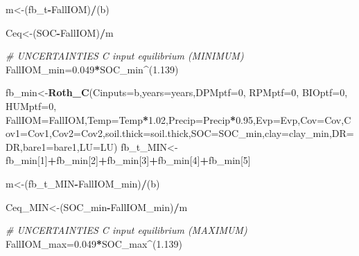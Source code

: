 \documentclass[
  10pt,
  b5paper,
]{book}
\newenvironment{Shaded}{\begin{snugshade}}{\end{snugshade}}
\newcommand{\CommentTok}[1]{\textcolor[rgb]{0.56,0.35,0.01}{\textit{#1}}}
\newcommand{\DataTypeTok}[1]{\textcolor[rgb]{0.13,0.29,0.53}{#1}}
\newcommand{\DecValTok}[1]{\textcolor[rgb]{0.00,0.00,0.81}{#1}}
\newcommand{\FloatTok}[1]{\textcolor[rgb]{0.00,0.00,0.81}{#1}}
\newcommand{\KeywordTok}[1]{\textcolor[rgb]{0.13,0.29,0.53}{\textbf{#1}}}
\newcommand{\NormalTok}[1]{#1}
\newcommand{\OperatorTok}[1]{\textcolor[rgb]{0.81,0.36,0.00}{\textbf{#1}}}
\begin{document}
\begin{Shaded}
\begin{Highlighting}[]
{\NormalTok{m<-(fb_t}\OperatorTok{-}\NormalTok{FallIOM)}\OperatorTok{/}\NormalTok{(b)}

\NormalTok{Ceq<-(SOC}\OperatorTok{-}\NormalTok{FallIOM)}\OperatorTok{/}\NormalTok{m}

\CommentTok{# UNCERTAINTIES C input equilibrium (MINIMUM)}
\NormalTok{FallIOM_min=}\FloatTok{0.049}\OperatorTok{*}\NormalTok{SOC_min}\OperatorTok{^}\NormalTok{(}\FloatTok{1.139}\NormalTok{) }

\NormalTok{fb_min<-}\KeywordTok{Roth_C}\NormalTok{(}\DataTypeTok{Cinputs=}\NormalTok{b,}\DataTypeTok{years=}\NormalTok{years,}\DataTypeTok{DPMptf=}\DecValTok{0}\NormalTok{, }\DataTypeTok{RPMptf=}\DecValTok{0}\NormalTok{, }\DataTypeTok{BIOptf=}\DecValTok{0}\NormalTok{, }\DataTypeTok{HUMptf=}\DecValTok{0}\NormalTok{, }\DataTypeTok{FallIOM=}\NormalTok{FallIOM,}\DataTypeTok{Temp=}\NormalTok{Temp}\OperatorTok{*}\FloatTok{1.02}\NormalTok{,}\DataTypeTok{Precip=}\NormalTok{Precip}\OperatorTok{*}\FloatTok{0.95}\NormalTok{,}\DataTypeTok{Evp=}\NormalTok{Evp,}\DataTypeTok{Cov=}\NormalTok{Cov,}\DataTypeTok{Cov1=}\NormalTok{Cov1,}\DataTypeTok{Cov2=}\NormalTok{Cov2,}\DataTypeTok{soil.thick=}\NormalTok{soil.thick,}\DataTypeTok{SOC=}\NormalTok{SOC_min,}\DataTypeTok{clay=}\NormalTok{clay_min,}\DataTypeTok{DR=}\NormalTok{DR,}\DataTypeTok{bare1=}\NormalTok{bare1,}\DataTypeTok{LU=}\NormalTok{LU)}
\NormalTok{fb_t_MIN<-fb_min[}\DecValTok{1}\NormalTok{]}\OperatorTok{+}\NormalTok{fb_min[}\DecValTok{2}\NormalTok{]}\OperatorTok{+}\NormalTok{fb_min[}\DecValTok{3}\NormalTok{]}\OperatorTok{+}\NormalTok{fb_min[}\DecValTok{4}\NormalTok{]}\OperatorTok{+}\NormalTok{fb_min[}\DecValTok{5}\NormalTok{]}

\NormalTok{m<-(fb_t_MIN}\OperatorTok{-}\NormalTok{FallIOM_min)}\OperatorTok{/}\NormalTok{(b)}

\NormalTok{Ceq_MIN<-(SOC_min}\OperatorTok{-}\NormalTok{FallIOM_min)}\OperatorTok{/}\NormalTok{m}

\CommentTok{# UNCERTAINTIES C input equilibrium (MAXIMUM)}
\NormalTok{FallIOM_max=}\FloatTok{0.049}\OperatorTok{*}\NormalTok{SOC_max}\OperatorTok{^}\NormalTok{(}\FloatTok{1.139}\NormalTok{) }

}
\end{Highlighting}
\end{Shaded}
\end{document}
